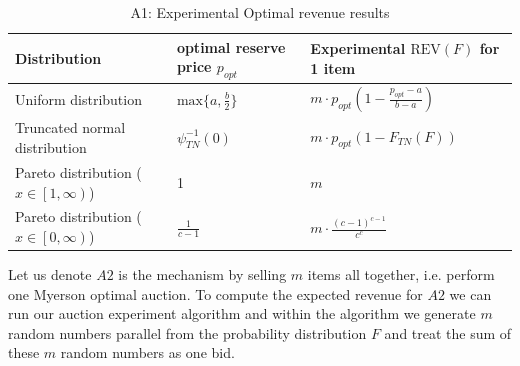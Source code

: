 \begin{center}
	\begin{table}[H]
		\begin{tabular}{ | m{5cm} | m{4cm} |m{4cm}|  } 
		\hline
		\textbf{Distribution}	&	\textbf{optimal reserve price $p_{opt}$}  & 	\textbf{Experimental $\text{REV}(F)$ for 1 item}   \\ 
		\hline
		Uniform distribution & $\text{max} \{a, \frac{b}{2} \}$ & $m \cdot p_{opt} (1-\frac {p_{opt}-a}{b-a})$  \\ 
		\hline
		Truncated normal distribution & $ \psi_{TN}^{-1}(0)$ & $ m \cdot p_{opt} (1-F_{TN}(F))$ \\ 
		\hline
		 Pareto distribution  ($x \in \left[1,\infty \right)$)& 1 & $m$ \\
		\hline
		 Pareto distribution  ($x \in \left[0,\infty \right)$)& $\frac{1}{c-1}$ & $m \cdot \frac{(c-1)^{c-1}}{c^c}$ \\
		\hline
		\end{tabular}
		\caption{A1: Experimental Optimal revenue results}
		\label{tab:optrevenueRE}
	\end{table}
\end{center}
Let us denote $A2$ is the mechanism by selling $m$ items all together, i.e. perform one Myerson optimal auction. To compute the expected revenue for $A2$ we can run our auction experiment algorithm and within the algorithm we generate $m$ random numbers parallel from the probability distribution $F$ and treat the sum of these $m$ random numbers as one bid.

